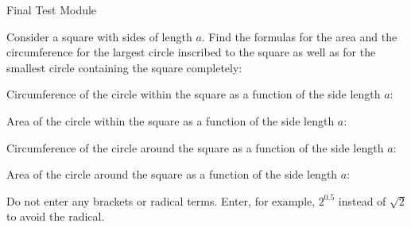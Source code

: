 \begin{MTest}{Final Test Module }
\begin{MExercise}
Consider a square with sides of length $a$. Find the formulas for the area and the circumference
for the largest circle inscribed to the square as well as for the smallest circle containing the 
square completely:
\begin{MExerciseItems}
\item{Circumference of the circle within the square as a function of the side length $a$: }
%
\item{Area of the circle within the square as a function of the side length $a$: }
%
\item{Circumference of the circle around the square as a function of the side length $a$: }
%
\item{Area of the circle around the square as a function of the side length $a$: }
\end{MExerciseItems}
\par

Do not enter any brackets or radical terms. Enter, for example, $2^{0.5}$ instead of $\sqrt{2}$
to avoid the radical.
\end{MExercise}

\end{MTest}

\printindex


